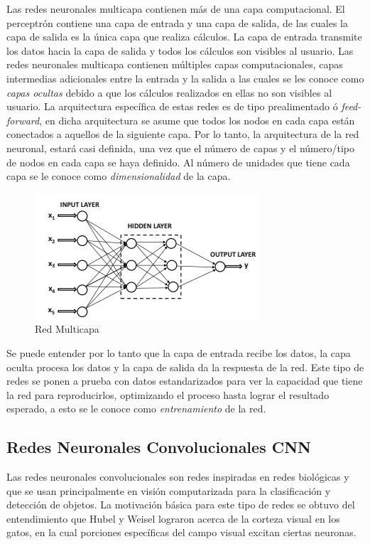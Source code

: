 Las redes neuronales multicapa contienen más de una capa computacional. El perceptrón contiene una capa de entrada y una capa de salida, de las cuales la capa de salida es la única capa que realiza cálculos. La capa de entrada transmite los datos hacia la capa de salida y todos los cálculos son visibles al usuario. Las redes neuronales multicapa contienen múltiples capas computacionales, capas intermedias adicionales entre la entrada y la salida a las cuales se les conoce como \textit{capas ocultas} debido a que los cálculos realizados en ellas no son visibles al usuario. La arquitectura específica de estas redes es de tipo prealimentado ó \textit{feed-forward}, en dicha arquitectura se asume que todos los nodos en cada capa están conectados a aquellos de la siguiente capa. Por lo tanto, la arquitectura de la red neuronal, estará casi definida, una vez que el número de capas y el número/tipo de nodos en cada capa se haya definido. Al número de unidades que tiene cada capa se le conoce como \textit{dimensionalidad} de la capa. \cite{neuralnetdeeplearning}

\begin{figure}[h!] %
		\centering	
		\includegraphics[scale=1]{redmulticapa.png}
		\caption{Red Multicapa}
\end{figure}

Se puede entender por lo tanto que la capa de entrada recibe los datos, la capa oculta procesa los datos y la capa de salida da la respuesta de la red. Este tipo de redes se ponen a prueba con datos estandarizados para ver la capacidad que tiene la red para reproducirlos, optimizando el proceso hasta lograr el resultado esperado, a esto se le conoce como \textit{entrenamiento} de la red.

\subsection{Redes Neuronales Convolucionales CNN}

Las redes neuronales convolucionales son redes inspiradas en redes biológicas y que se usan principalmente en visión computarizada para la clasificación y detección de objetos. La motivación básica para este tipo de redes se obtuvo del entendimiento que Hubel y Weisel lograron acerca de la corteza visual en los gatos, en la cual porciones específicas del campo visual excitan ciertas neuronas. 

